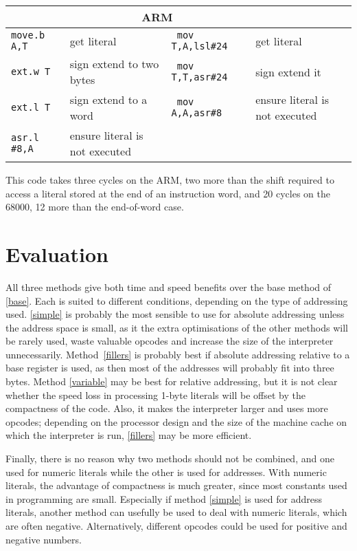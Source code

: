 \documentclass{article}
\newenvironment{code}%
{\begin{small}\begin{tabular}{>{\tt}ll>{\tt}ll}\toprule%
\multicolumn{2}{c}{\bf 68000} & \multicolumn{2}{c}{\bf ARM} \\%
\midrule}%
{\bottomrule\end{tabular}\end{small}}
\begin{document}
\begin{center}
\begin{code}

move.b A,T & get literal & mov T,A,lsl\#24 & get literal \\

ext.w T & sign extend to two bytes & mov T,T,asr\#24 & sign extend it \\

ext.l T & sign extend to a word & mov A,A,asr\#8 & ensure literal is not executed \\

asr.l \#8,A & ensure literal is not executed &&\\

\end{code}
\end{center}
\noindent This code takes three cycles on the ARM, two more than the shift required
to access a literal stored at the end of an instruction word, and 20 cycles on
the 68000, 12 more than the end-of-word case.


\section{Evaluation}

All three methods give both time and speed benefits over the base method of \ref{base}.
Each is suited to different conditions, depending on the type of addressing used.
\ref{simple} is probably the most sensible to use for absolute addressing unless
the address space is small, as it the extra optimisations of the other methods
will be rarely used, waste valuable opcodes and increase the size of the interpreter
unnecessarily. Method~\ref{fillers} is probably best if absolute addressing
relative to a base register is used, as then most of the addresses will probably
fit into three bytes. Method \ref{variable} may be best for relative addressing,
but it is not clear whether the speed loss in processing 1-byte literals will
be offset by the compactness of the code. Also, it makes the interpreter larger
and uses more opcodes; depending on the processor design and the size of the machine
cache on which the interpreter is run, \ref{fillers} may be more efficient.

Finally, there is no reason why two methods should not be combined, and one used
for numeric literals while the other is used for addresses. With numeric literals,
the advantage of compactness is much greater, since most constants used in programming
are small. Especially if method \ref{simple} is used for address literals, another
method can usefully be used to deal with numeric literals, which are often negative.
Alternatively, different opcodes could be used for positive and negative numbers.
\end{document}
